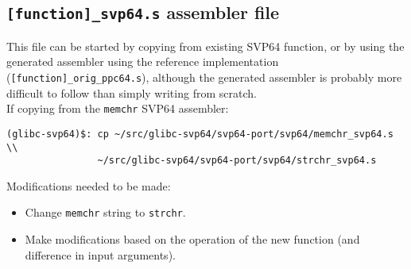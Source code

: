 \subsection{\texttt{[function]\_svp64.s} assembler file}

This file can be started by copying from existing SVP64 function, or by using
the generated assembler using the reference implementation
(\texttt{[function]\_orig\_ppc64.s}), although the generated assembler is
probably more difficult to follow than simply writing from scratch.\\

If copying from the \texttt{memchr} SVP64 assembler:
\begin{verbatim}
(glibc-svp64)$: cp ~/src/glibc-svp64/svp64-port/svp64/memchr_svp64.s \\
                ~/src/glibc-svp64/svp64-port/svp64/strchr_svp64.s
\end{verbatim}

Modifications needed to be made:
\begin{itemize}
  \item Change \texttt{memchr} string to \texttt{strchr}.
  \item Make modifications based on the operation of the new function
  (and difference in input arguments).
\end{itemize}
